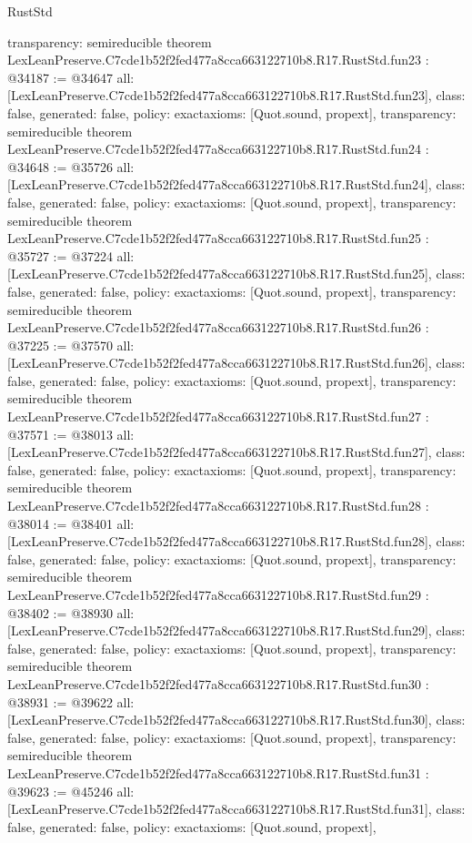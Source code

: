 \begin{lexlean}{RustStd}
\begin{coremodule}
{  transparency: semireducible
}
theorem LexLeanPreserve.C7cde1b52f2fed477a8cca663122710b8.R17.RustStd.fun23 : @34187 := @34647 {
  all: [LexLeanPreserve.C7cde1b52f2fed477a8cca663122710b8.R17.RustStd.fun23],
  class: false,
  generated: false,
  policy: exact{axioms: [Quot.sound, propext]},
  transparency: semireducible
}
theorem LexLeanPreserve.C7cde1b52f2fed477a8cca663122710b8.R17.RustStd.fun24 : @34648 := @35726 {
  all: [LexLeanPreserve.C7cde1b52f2fed477a8cca663122710b8.R17.RustStd.fun24],
  class: false,
  generated: false,
  policy: exact{axioms: [Quot.sound, propext]},
  transparency: semireducible
}
theorem LexLeanPreserve.C7cde1b52f2fed477a8cca663122710b8.R17.RustStd.fun25 : @35727 := @37224 {
  all: [LexLeanPreserve.C7cde1b52f2fed477a8cca663122710b8.R17.RustStd.fun25],
  class: false,
  generated: false,
  policy: exact{axioms: [Quot.sound, propext]},
  transparency: semireducible
}
theorem LexLeanPreserve.C7cde1b52f2fed477a8cca663122710b8.R17.RustStd.fun26 : @37225 := @37570 {
  all: [LexLeanPreserve.C7cde1b52f2fed477a8cca663122710b8.R17.RustStd.fun26],
  class: false,
  generated: false,
  policy: exact{axioms: [Quot.sound, propext]},
  transparency: semireducible
}
theorem LexLeanPreserve.C7cde1b52f2fed477a8cca663122710b8.R17.RustStd.fun27 : @37571 := @38013 {
  all: [LexLeanPreserve.C7cde1b52f2fed477a8cca663122710b8.R17.RustStd.fun27],
  class: false,
  generated: false,
  policy: exact{axioms: [Quot.sound, propext]},
  transparency: semireducible
}
theorem LexLeanPreserve.C7cde1b52f2fed477a8cca663122710b8.R17.RustStd.fun28 : @38014 := @38401 {
  all: [LexLeanPreserve.C7cde1b52f2fed477a8cca663122710b8.R17.RustStd.fun28],
  class: false,
  generated: false,
  policy: exact{axioms: [Quot.sound, propext]},
  transparency: semireducible
}
theorem LexLeanPreserve.C7cde1b52f2fed477a8cca663122710b8.R17.RustStd.fun29 : @38402 := @38930 {
  all: [LexLeanPreserve.C7cde1b52f2fed477a8cca663122710b8.R17.RustStd.fun29],
  class: false,
  generated: false,
  policy: exact{axioms: [Quot.sound, propext]},
  transparency: semireducible
}
theorem LexLeanPreserve.C7cde1b52f2fed477a8cca663122710b8.R17.RustStd.fun30 : @38931 := @39622 {
  all: [LexLeanPreserve.C7cde1b52f2fed477a8cca663122710b8.R17.RustStd.fun30],
  class: false,
  generated: false,
  policy: exact{axioms: [Quot.sound, propext]},
  transparency: semireducible
}
theorem LexLeanPreserve.C7cde1b52f2fed477a8cca663122710b8.R17.RustStd.fun31 : @39623 := @45246 {
  all: [LexLeanPreserve.C7cde1b52f2fed477a8cca663122710b8.R17.RustStd.fun31],
  class: false,
  generated: false,
  policy: exact{axioms: [Quot.sound, propext]},
}
\end{coremodule}
\end{lexlean}
